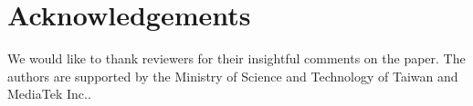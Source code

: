 \documentclass[11pt,letterpaper]{article}
\begin{document}
\section*{Acknowledgements}
We would like to thank reviewers for their insightful comments on the paper.
The authors are supported by the Ministry of Science and Technology of Taiwan and MediaTek Inc..



\end{document}
